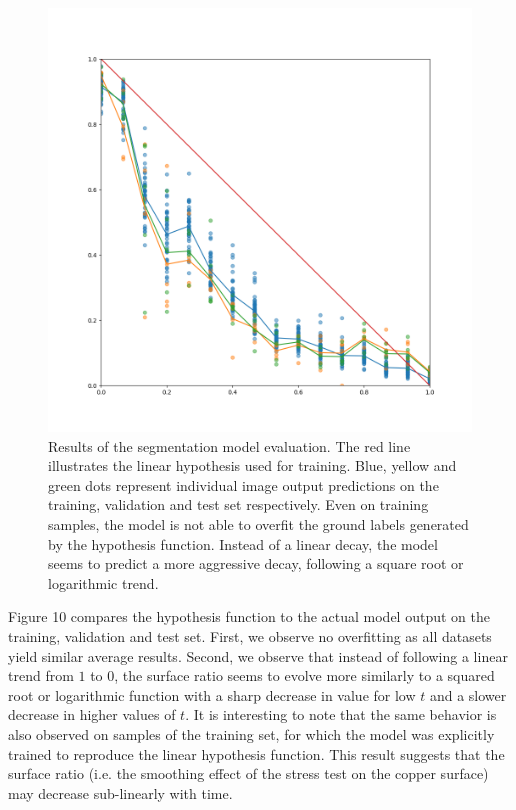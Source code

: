 \documentclass[10pt,twocolumn,letterpaper]{article}
\begin{document}
\begin{figure}[h]
\centering
\includegraphics[width=0.9\linewidth]{"./figures/Figure10"}
\caption{
Results of the segmentation model evaluation.
The red line illustrates the linear hypothesis used for training.
Blue, yellow and green dots represent individual image output predictions 
on the training, validation and test set respectively.
Even on training samples, the model is not able to overfit the ground labels 
generated by the hypothesis function.
Instead of a linear decay, the model seems to predict a more aggressive decay,
following a square root or logarithmic trend.  
}
\end{figure}

Figure 10 compares the hypothesis function to the actual model output on the training, 
validation and test set.
First, we observe no overfitting as all datasets yield similar average results.
Second, we observe that instead of following a linear trend from $1$ to $0$, 
the surface ratio seems to evolve more similarly to a squared root or logarithmic function
with a sharp decrease in value for low $t$ and a slower decrease in higher values of $t$.
It is interesting to note that the same behavior is also observed on samples of the training set, 
for which the model was explicitly trained to reproduce the linear hypothesis function.
This result suggests that the surface ratio 
(i.e. the smoothing effect of the stress test on the copper surface) 
may decrease sub-linearly with time.
\end{document}
